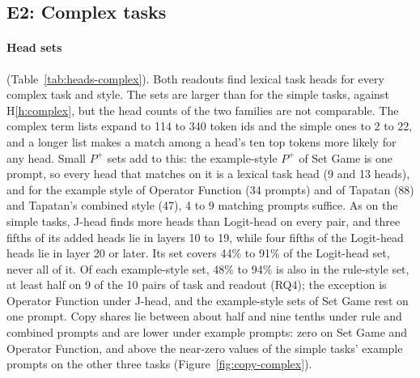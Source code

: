 \documentclass[11pt,a4paper]{article}
\begin{document}
\begin{table}[tbp]
\centering\footnotesize\setlength{\tabcolsep}{3.5pt}

\caption{E0, complex tasks: flexible accuracy per prompt (Sec.~\ref{sec:evaluation}), on the same saved replies and with the same layout as Table~\ref{tab:e0-complex}.}
\label{tab:e0-complex-flexible}
\end{table}

\subsection{E2: Complex tasks}\label{sec:res-e2}
\paragraph{Head sets} (Table~\ref{tab:heads-complex}). Both readouts find lexical task heads for every complex task and style. The sets are larger than for the simple tasks, against H\ref{h:complex}, but the head counts of the two families are not comparable. The complex term lists expand to 114 to 340 token ids and the simple ones to 2 to 22, and a longer list makes a match among a head's ten top tokens more likely for any head. Small $P^{+}$ sets add to this: the example-style $P^{+}$ of Set Game is one prompt, so every head that matches on it is a lexical task head (9 and 13 heads), and for the example style of Operator Function (34 prompts) and of Tapatan (88) and Tapatan's combined style (47), 4 to 9 matching prompts suffice. As on the simple tasks, J-head finds more heads than Logit-head on every pair, and three fifths of its added heads lie in layers 10 to 19, while four fifths of the Logit-head heads lie in layer 20 or later. Its set covers 44\% to 91\% of the Logit-head set, never all of it. Of each example-style set, 48\% to 94\% is also in the rule-style set, at least half on 9 of the 10 pairs of task and readout (RQ4); the exception is Operator Function under J-head, and the example-style sets of Set Game rest on one prompt. Copy shares lie between about half and nine tenths under rule and combined prompts and are lower under example prompts: zero on Set Game and Operator Function, and above the near-zero values of the simple tasks' example prompts on the other three tasks (Figure~\ref{fig:copy-complex}).
\end{document}
